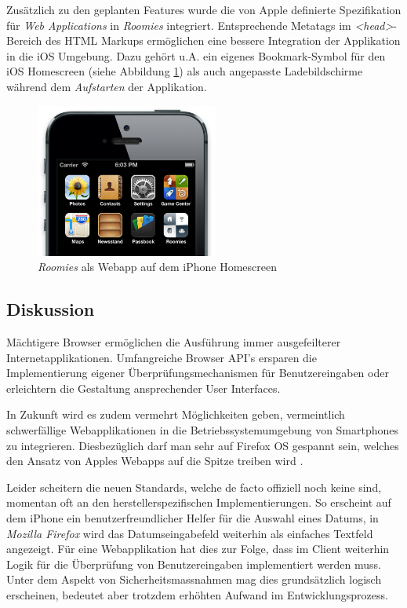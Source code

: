 Zusätzlich zu den geplanten Features wurde die von Apple definierte Spezifikation für \emph{Web Applications} \cite{SafariWebApp} in \emph{Roomies} integriert. Entsprechende Metatags im \emph{<head>}-Bereich des HTML Markups ermöglichen eine bessere Integration der Applikation in die iOS Umgebung. Dazu gehört u.A. ein eigenes Bookmark-Symbol für den iOS Homescreen (siehe Abbildung \ref{fig:webapp-homescreen-icon}) als auch angepasste Ladebildschirme während dem \emph{Aufstarten} der Applikation.

\begin{figure}[H]
	\centering
	\includegraphics[width=6cm]{content/principle-demonstration/images/ios-webapp-homescreenicon.png}
	\caption{\emph{Roomies} als Webapp auf dem iPhone Homescreen}
	\label{fig:webapp-homescreen-icon}
\end{figure}


\subsection*{Diskussion}

Mächtigere Browser ermöglichen die Ausführung immer ausgefeilterer Internetapplikationen. Umfangreiche Browser API's ersparen die Implementierung eigener Überprüfungsmechanismen für Benutzereingaben oder erleichtern die Gestaltung ansprechender User Interfaces.

In Zukunft wird es zudem vermehrt Möglichkeiten geben, vermeintlich schwerfällige Webapplikationen in die Betriebssystemumgebung von Smartphones zu integrieren. Diesbezüglich darf man sehr auf Firefox OS gespannt sein, welches den Ansatz von Apples Webapps auf die Spitze treiben wird \cite{FirefoxOSWebApp}.

Leider scheitern die neuen Standards, welche de facto offiziell noch keine sind, momentan oft an den herstellerspezifischen Implementierungen. So erscheint auf dem iPhone ein benutzerfreundlicher Helfer für die Auswahl eines Datums, in \emph{Mozilla Firefox} \cite{CanIUseDateInput} wird das Datumseingabefeld weiterhin als einfaches Textfeld angezeigt. Für eine Webapplikation hat dies zur Folge, dass im Client weiterhin Logik für die Überprüfung von Benutzereingaben implementiert werden muss. Unter dem Aspekt von Sicherheitsmassnahmen mag dies grundsätzlich logisch erscheinen, bedeutet aber trotzdem erhöhten Aufwand im Entwicklungsprozess.

